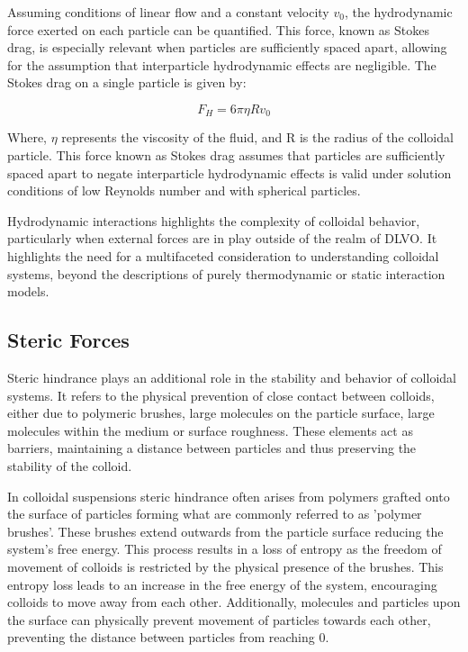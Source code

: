 Assuming conditions of linear flow and a constant velocity \( v_0 \), the hydrodynamic force exerted on each particle can be quantified. This force, known as Stokes drag, is especially relevant when particles are sufficiently spaced apart, allowing for the assumption that interparticle hydrodynamic effects are negligible. The Stokes drag on a single particle is given by:

\begin{equation}
F_H = 6 \pi \eta R v_0
\end{equation}

Where, \( \eta \) represents the viscosity of the fluid, and R is the radius of the colloidal particle. This force known as Stokes drag assumes that particles are sufficiently spaced apart to negate interparticle hydrodynamic effects is valid under solution conditions of low Reynolds number and with spherical particles.\cite{naudascher1991hydrodynamic}

Hydrodynamic interactions highlights the complexity of colloidal behavior, particularly when external forces are in play outside of the realm of DLVO. It highlights the need for a multifaceted consideration to understanding colloidal systems, beyond the descriptions of purely thermodynamic or static interaction models.

\subsection{Steric Forces}

Steric hindrance plays an additional role in the stability and behavior of colloidal systems. It refers to the physical prevention of close contact between colloids, either due to polymeric brushes, large molecules on the particle surface, large molecules within the medium or surface roughness. These elements act as barriers, maintaining a distance between particles and thus preserving the stability of the colloid.

In colloidal suspensions steric hindrance often arises from polymers grafted onto the surface of particles forming what are commonly referred to as 'polymer brushes'. These brushes extend outwards from the particle surface reducing the system's free energy. This process results in a loss of entropy as the freedom of movement of colloids is restricted by the physical presence of the brushes. This entropy loss leads to an increase in the free energy of the system, encouraging colloids to move away from each other. Additionally, molecules and particles upon the surface can physically prevent movement of particles towards each other, preventing the distance between particles from reaching 0. 

